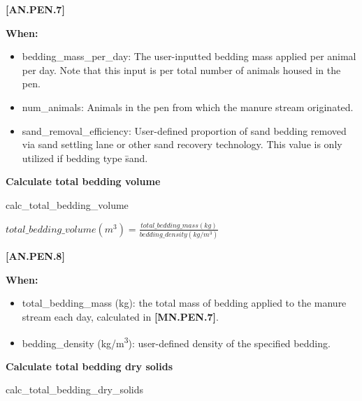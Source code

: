 \begin{refsection}
            {\raggedleft \textbf{[AN.PEN.7]}\par}
            \vspace{0.5cm}

\textbf{When:}
    \begin{itemize}
        \item bedding\_mass\_per\_day: The user-inputted bedding mass applied per animal per day. Note that this input is per total number of animals housed in the pen.
        \item num\_animals: Animals in the pen from which the manure stream originated.
        \item sand\_removal\_efficiency: User-defined proportion of sand bedding removed via sand settling lane or other sand recovery technology. This value is only utilized if bedding type \= sand.
    \end{itemize}

\textbf{Calculate total bedding volume}
\vspace{ 0.25cm}

calc\_total\_bedding\_volume

\vspace{0.2cm}

    \begin{center}
        \(total\_bedding\_volume (m^3) = \frac{total\_bedding\_mass (kg)}{bedding\_density (kg/m^3)}  \)
    \end{center}
        \vspace{0.5cm}
    
            {\raggedleft \textbf{[AN.PEN.8]}\par}
            \vspace{0.5cm}

\textbf{When:}
    \begin{itemize}
        \item total\_bedding\_mass (kg): the total mass of bedding applied to the manure stream each day, calculated in \textbf{[MN.PEN.7]}.
        \item bedding\_density (kg/m\textsuperscript{3}): user-defined density of the specified bedding.

    \end{itemize}

\textbf{Calculate total bedding dry solids}
\vspace{ 0.25cm}

calc\_total\_bedding\_dry\_solids

\vspace{0.2cm}


\end{refsection}
